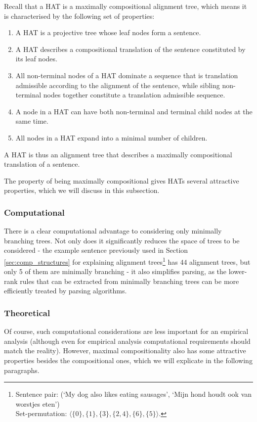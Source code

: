 \documentclass[hidelinks]{report}
\begin{document}
Recall that a HAT is a maximally compositional alignment tree, which means it is characterised by the following set of properties:\begin{enumerate}
\item A HAT is a projective tree whose leaf nodes form a sentence.
\item A HAT describes a compositional translation of the sentence constituted by its leaf nodes.
\item All non-terminal nodes of a HAT dominate a sequence that is translation admissible according to the alignment of the sentence, while sibling non-terminal nodes together constitute a translation admissible sequence.
\item A node in a HAT can have both non-terminal and terminal child nodes at the same time.
\item All nodes in a HAT expand into a minimal number of children.
\end{enumerate}

\noindent A HAT is thus an alignment tree that describes a maximally compositional translation of a sentence. 

The property of being maximally compositional gives HATs several attractive properties, which we will discuss in this subsection.

\subsubsection{Computational}
There is a clear computational advantage to considering only minimally branching trees. Not only does it significantly reduces the space of trees to be considered - the example sentence previously used in Section \ref{sec:comp_structures} for explaining alignment trees\footnote{Sentence pair: (`My dog also likes eating sausages', `Mijn hond houdt ook van worstjes eten')\\Set-permutation: $\langle \{0\}, \{1\}, \{3\}, \{2,4\}, \{6\}, \{5\}\rangle$. } has 44 alignment trees, but only 5 of them are minimally branching - it also simplifies parsing, as the lower-rank rules that can be extracted from minimally branching trees can be more efficiently treated by parsing algorithms.

\subsubsection{Theoretical}

Of course, such computational considerations are less important for an empirical analysis (although even for empirical analysis computational requirements should match the reality). However, maximal compositionality also has some attractive properties besides the compositional ones, which we will explicate in the following paragraphs.
\end{document}
